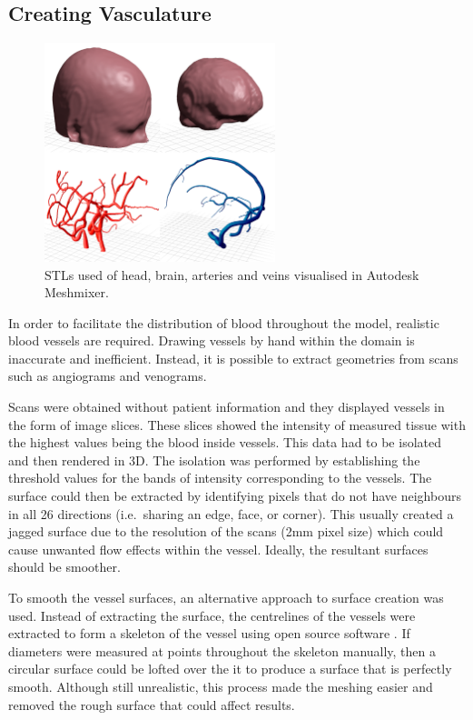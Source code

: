 \documentclass[11pt,english,a4paper,twoside,openright]{report}
\begin{document}
{{{{{{{{\subsection{Creating Vasculature}

\begin{figure}[h]
	\centering
	\includegraphics[width=0.6\textwidth]{3DFullVessels/STLs1}
	\caption[STLs used of head, brain, arteries and veins visualised in Autodesk Meshmixer]{STLs used of head, brain, arteries and veins visualised in Autodesk Meshmixer.}
	\label{fig:STLs1}
\end{figure}

In order to facilitate the distribution of blood throughout the model, realistic blood vessels are required. Drawing vessels by hand within the domain is inaccurate and inefficient. Instead, it is possible to extract geometries from scans such as angiograms and venograms. 

Scans were obtained without patient information and they displayed vessels in the form of image slices. These slices showed the intensity of measured tissue with the highest values being the blood inside vessels. This data had to be isolated and then rendered in 3D. The isolation was performed by establishing the threshold values for the bands of intensity corresponding to the vessels. The surface could then be extracted by identifying pixels that do not have neighbours in all 26 directions (i.e.\ sharing an edge, face, or corner). This usually created a jagged surface due to the resolution of the scans (2mm pixel size) which could cause unwanted flow effects within the vessel. Ideally, the resultant surfaces should be smoother.

To smooth the vessel surfaces, an alternative approach to surface creation was used. Instead of extracting the surface, the centrelines of the vessels were extracted to form a skeleton of the vessel using open source software \cite{kroon2011accurate}. If diameters were measured at points throughout the skeleton manually, then a circular surface could be lofted over the it to produce a surface that is perfectly smooth. Although still unrealistic, this process made the meshing easier and removed the rough surface that could affect results.

}}}}}}}}
\end{document}
